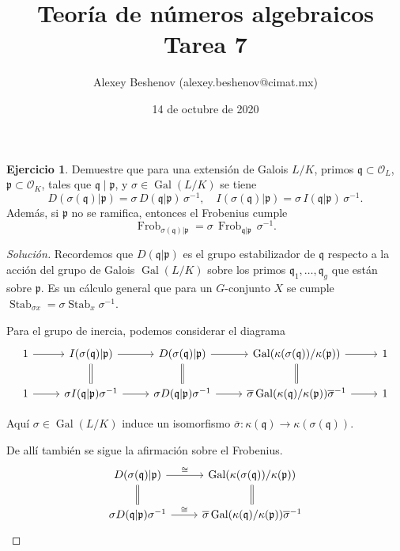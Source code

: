 \documentclass{article}
\title{Teoría de números algebraicos\\Tarea 7}
\author{Alexey Beshenov (alexey.beshenov@cimat.mx)}
\date{14 de octubre de 2020}
\newcounter{tarea}
\theoremstyle{definition}
\newtheorem{ejercicio}{Ejercicio}[tarea]
\newenvironment{solucion}{\begin{proof}[Solución]}{\end{proof}}
\DeclareMathOperator{\Gal}{Gal}
\DeclareMathOperator{\Frob}{Frob}
\DeclareMathOperator{\Stab}{Stab}
\renewcommand{\O}{\mathcal{O}}
\begin{document}
{\sffamily\bfseries\maketitle}

\ifdefined\solutions
\else
\thispagestyle{empty}
\fi

\vspace{1em}

\begin{ejercicio}
  Demuestre que para una extensión de Galois $L/K$, primos
  $\mathfrak{q} \subset \O_L$, $\mathfrak{p} \subset \O_K$,
  tales que
  $\mathfrak{q} \mid \mathfrak{p}$, y $\sigma \in \Gal (L/K)$ se tiene
  \[ D (\sigma (\mathfrak{q})|\mathfrak{p}) =
  \sigma \, D (\mathfrak{q}|\mathfrak{p}) \, \sigma^{-1}, \quad
  I (\sigma (\mathfrak{q})|\mathfrak{p}) =
  \sigma \, I (\mathfrak{q}|\mathfrak{p}) \, \sigma^{-1}. \]
  Además, si $\mathfrak{p}$ no se ramifica, entonces el Frobenius cumple
  \[ \Frob_{\sigma (\mathfrak{q})|\mathfrak{p}} =
     \sigma \, \Frob_{\mathfrak{q}|\mathfrak{p}} \, \sigma^{-1}. \]

  \ifdefined\solutions
  \begin{solucion}
    Recordemos que $D (\mathfrak{q}|\mathfrak{p})$ es el grupo estabilizador de
    $\mathfrak{q}$ respecto a la acción del grupo de Galois $\Gal (L/K)$ sobre
    los primos $\mathfrak{q}_1,\ldots,\mathfrak{q}_g$ que están sobre
    $\mathfrak{p}$. Es un cálculo general que para un $G$-conjunto $X$ se cumple
    $\Stab_{\sigma x} = \sigma \Stab_x \sigma^{-1}$.

    Para el grupo de inercia, podemos considerar el diagrama
    \[ \begin{tikzcd}
        1 \ar{r} & I (\sigma(\mathfrak{q})|\mathfrak{p}) \ar{r}\ar[equals]{d} & D (\sigma(\mathfrak{q})|\mathfrak{p}) \ar{r}\ar[equals]{d} & \Gal (\kappa(\sigma(\mathfrak{q}))/\kappa(\mathfrak{p})) \ar{r}\ar[equals]{d} & 1 \\
        1 \ar{r} & \sigma I (\mathfrak{q}|\mathfrak{p}) \sigma^{-1} \ar{r} & \sigma D (\mathfrak{q}|\mathfrak{p}) \sigma^{-1} \ar{r} & \overline{\sigma} \Gal (\kappa(\mathfrak{q})/\kappa(\mathfrak{p})) \overline{\sigma}^{-1} \ar{r} & 1
      \end{tikzcd} \]

    Aquí $\sigma \in \Gal (L/K)$ induce un isomorfismo
    $\overline{\sigma}\colon \kappa (\mathfrak{q}) \to \kappa (\sigma (\mathfrak{q}))$.

    De allí también se sigue la afirmación sobre el Frobenius.
    \[ \begin{tikzcd}
        D (\sigma(\mathfrak{q})|\mathfrak{p}) \ar{r}{\cong}\ar[equals]{d} & \Gal (\kappa(\sigma(\mathfrak{q}))/\kappa(\mathfrak{p})) \ar[equals]{d} \\
        \sigma D (\mathfrak{q}|\mathfrak{p}) \sigma^{-1} \ar{r}{\cong} & \overline{\sigma} \Gal (\kappa(\mathfrak{q})/\kappa(\mathfrak{p})) \overline{\sigma}^{-1}
      \end{tikzcd} \]
  \end{solucion}
  \fi
\end{ejercicio}
\end{document}
